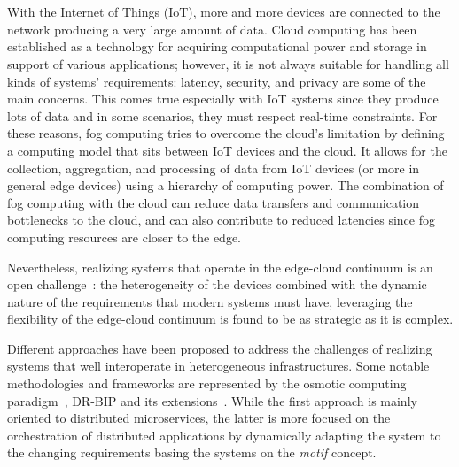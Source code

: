 \chapter{\introductionname}
\label{chap:introduction}

With the Internet of Things (IoT), more and more devices are connected to the network producing a very large amount of data.
Cloud computing has been established as a technology for acquiring computational power and storage in support of various applications;
however, it is not always suitable for handling all kinds of systems' requirements: latency, security, and privacy are some of the main
concerns. This comes true especially with IoT systems since they produce lots of data and in some scenarios, they must respect real-time constraints.
For these reasons, fog computing tries to overcome the cloud's limitation by defining a computing model that sits between IoT devices and the cloud.
It allows for the collection, aggregation, and processing of data from IoT devices (or more in general edge devices) using a hierarchy of computing
power.
The combination of fog computing with the cloud can reduce data transfers and communication bottlenecks to the cloud, and can also contribute to
reduced latencies since fog computing resources are closer to the edge.

Nevertheless, realizing systems that operate in the edge-cloud continuum is an open challenge~\cite{DBLP:journals/iot/BittencourtISFM18}:
the heterogeneity of the devices combined with the dynamic nature of the requirements that modern systems must have, leveraging the flexibility of
the edge-cloud continuum is found to be as strategic as it is complex.

Different approaches have been proposed to address the challenges of realizing systems that well interoperate in heterogeneous
infrastructures. Some notable methodologies and frameworks are represented by the osmotic computing paradigm~\cite{DBLP:journals/computer/VillariFDRJR19}, DR-BIP and its
extensions~\cite{DBLP:conf/isola/BallouliBBS18,DBLP:conf/soco/BozgaJMS12,DBLP:journals/sttt/NicolaMS20}.
While the first approach is mainly oriented to distributed microservices, the latter is more focused on the orchestration of distributed
applications by dynamically adapting the system to the changing requirements basing the systems on the \emph{motif} concept.


